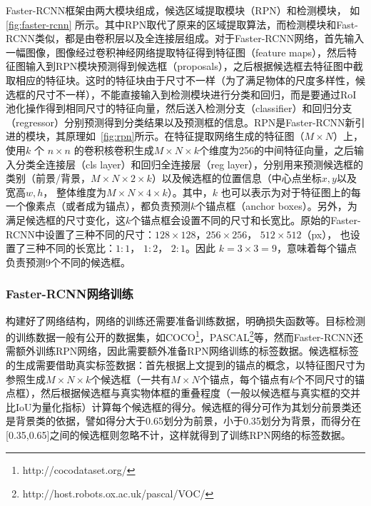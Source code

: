 Faster-RCNN框架由两大模块组成，候选区域提取模块（RPN）和检测模块， 如 \figurename \, \ref{fig:faster-rcnn} 所示。其中RPN取代了原来的区域提取算法，而检测模块和Fast-RCNN类似，都是由卷积层以及全连接层组成。对于Faster-RCNN网络，首先输入一幅图像，图像经过卷积神经网络提取特征得到特征图（feature maps），然后特征图输入到RPN模块预测得到候选框（proposals），之后根据候选框去特征图中截取相应的特征块。这时的特征块由于尺寸不一样（为了满足物体的尺度多样性，候选框的尺寸不一样），不能直接输入到检测模块进行分类和回归，而是要通过RoI池化操作得到相同尺寸的特征向量，然后送入检测分支（classifier）和回归分支（regressor）分别预测得到分类结果以及预测框的信息。RPN是Faster-RCNN新引进的模块，其原理如\figurename \, \ref{fig:rpn}所示。在特征提取网络生成的特征图（$M \times N$）上，使用$k$ 个 $n \times n$ 的卷积核卷积生成$M \times N \times k$个维度为256的中间特征向量，之后输入分类全连接层（cls layer）和回归全连接层（reg layer），分别用来预测候选框的类别（前景/背景，$M \times N \times 2 \times k$）以及候选框的位置信息（中心点坐标$x, y$以及宽高$w, h$， 整体维度为$M \times N \times 4 \times k$）。其中，$k$ 也可以表示为对于特征图上的每一个像素点（或者成为锚点），都负责预测$k$个锚点框（anchor boxes）。另外，为满足候选框的尺寸变化，这$k$个锚点框会设置不同的尺寸和长宽比。原始的Faster-RCNN中设置了三种不同的尺寸：$128\times 128$，$256 \times 256$， $512 \times 512$（px）， 也设置了三种不同的长宽比：$1:1$， $1:2$， $2:1$。因此 $k = 3 \times 3 = 9$，意味着每个锚点负责预测9个不同的候选框。

\subsubsection{Faster-RCNN网络训练}
构建好了网络结构，网络的训练还需要准备训练数据，明确损失函数等。目标检测的训练数据一般有公开的数据集，如COCO\footnote[5]{http://cocodataset.org/}，PASCAL\footnote[6]{http://host.robots.ox.ac.uk/pascal/VOC/}等，然而Faster-RCNN还需额外训练RPN网络，因此需要额外准备RPN网络训练的标签数据。候选框标签的生成需要借助真实标签数据：首先根据上文提到的锚点的概念，以特征图尺寸为参照生成$M \times N \times k$个候选框（一共有$M \times N$个锚点，每个锚点有$k$个不同尺寸的锚点框），然后根据候选框与真实物体框的重叠程度（一般以候选框与真实框的交并比IoU为量化指标）计算每个候选框的得分。候选框的得分可作为其划分前景类还是背景类的依据，譬如得分大于0.65划分为前景，小于0.35划分为背景，而得分在[0.35,0.65]之间的候选框则忽略不计，这样就得到了训练RPN网络的标签数据。

